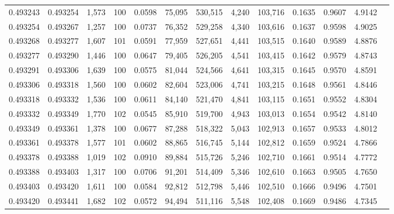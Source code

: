 \begin{tabular}{rrrrrrrrrrrrr}
0.493243 & 0.493254 & 1,573 & 100 &                                     0.0598 &  75,095 & 530,515 &   4,240 & 103,716 & 0.1635 & 0.9607 & 4.9142 \\
0.493254 & 0.493267 & 1,257 & 100 &                                     0.0737 &  76,352 & 529,258 &   4,340 & 103,616 & 0.1637 & 0.9598 & 4.9025 \\
0.493268 & 0.493277 & 1,607 & 101 &                                     0.0591 &  77,959 & 527,651 &   4,441 & 103,515 & 0.1640 & 0.9589 & 4.8876 \\
0.493277 & 0.493290 & 1,446 & 100 &                                     0.0647 &  79,405 & 526,205 &   4,541 & 103,415 & 0.1642 & 0.9579 & 4.8743 \\
0.493291 & 0.493306 & 1,639 & 100 &                                     0.0575 &  81,044 & 524,566 &   4,641 & 103,315 & 0.1645 & 0.9570 & 4.8591 \\
0.493306 & 0.493318 & 1,560 & 100 &                                     0.0602 &  82,604 & 523,006 &   4,741 & 103,215 & 0.1648 & 0.9561 & 4.8446 \\
0.493318 & 0.493332 & 1,536 & 100 &                                     0.0611 &  84,140 & 521,470 &   4,841 & 103,115 & 0.1651 & 0.9552 & 4.8304 \\
0.493332 & 0.493349 & 1,770 & 102 &                                     0.0545 &  85,910 & 519,700 &   4,943 & 103,013 & 0.1654 & 0.9542 & 4.8140 \\
0.493349 & 0.493361 & 1,378 & 100 &                                     0.0677 &  87,288 & 518,322 &   5,043 & 102,913 & 0.1657 & 0.9533 & 4.8012 \\
0.493361 & 0.493378 & 1,577 & 101 &                                     0.0602 &  88,865 & 516,745 &   5,144 & 102,812 & 0.1659 & 0.9524 & 4.7866 \\
0.493378 & 0.493388 & 1,019 & 102 &                                     0.0910 &  89,884 & 515,726 &   5,246 & 102,710 & 0.1661 & 0.9514 & 4.7772 \\
0.493388 & 0.493403 & 1,317 & 100 &                                     0.0706 &  91,201 & 514,409 &   5,346 & 102,610 & 0.1663 & 0.9505 & 4.7650 \\
0.493403 & 0.493420 & 1,611 & 100 &                                     0.0584 &  92,812 & 512,798 &   5,446 & 102,510 & 0.1666 & 0.9496 & 4.7501 \\
0.493420 & 0.493441 & 1,682 & 102 &                                     0.0572 &  94,494 & 511,116 &   5,548 & 102,408 & 0.1669 & 0.9486 & 4.7345 \\

\end{tabular}

